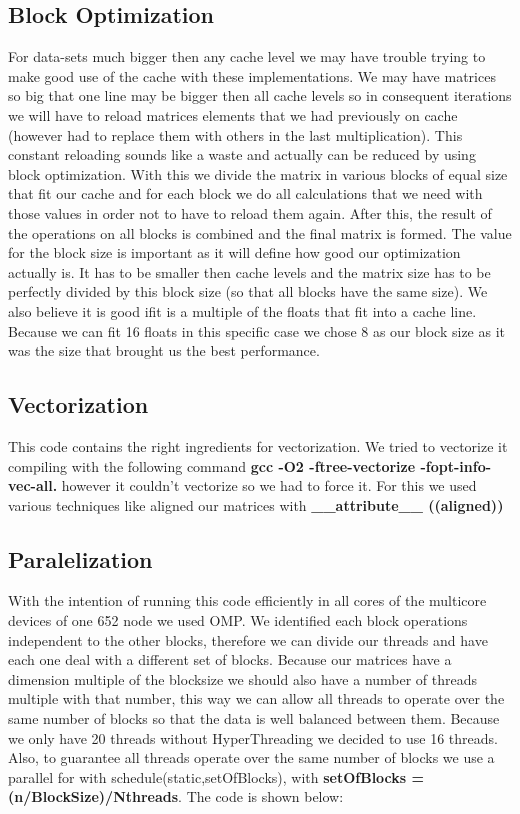 \documentclass[journal]{IEEEtran}
\begin{document}
\subsection{Block Optimization}
For data-sets much bigger then any cache level we may have trouble trying to make good use of the cache with these implementations. We may have matrices so big that one line may be bigger then all cache levels so in consequent iterations we will have to reload matrices elements that we had previously on cache (however had to replace them with others in the last multiplication). This constant reloading sounds like a waste and actually can be reduced by using block optimization. With this we divide the matrix in various blocks of equal size that fit our cache and for each block we do all calculations that we need with those values in order not to have to reload them again. After this, the result of the operations on all blocks is combined and the final matrix is formed. The value for the block size is important as it will define how good our optimization actually is. It has to be smaller then cache levels and the matrix size has to be perfectly divided by this block size (so that all blocks have the same size). We also believe it is good ifit is a multiple of the floats that fit into a cache line. Because we can fit 16 floats in this specific case we chose 8 as our block size as it was the size that brought us the best performance. 

\subsection{Vectorization}

This code contains the right ingredients for vectorization. We tried to vectorize it compiling with the following command \textbf{gcc -O2 -ftree-vectorize -fopt-info-vec-all.} however it couldn't vectorize so we had to force it. For this we used various techniques like aligned our matrices with \textbf{\_\_attribute\_\_ ((aligned))} 

\subsection{Paralelization}

With the intention of running this code efficiently in all cores of the multicore devices of one 652 node we used OMP. We identified each block operations independent to the other blocks, therefore we can divide our threads and have each one deal with a different set of blocks. Because our matrices have a dimension multiple of the blocksize we should also have a number of threads multiple with that number, this way we can allow all threads to operate over the same number of blocks so that the data is well balanced between them. Because we only have 20 threads without HyperThreading we decided to use 16 threads. Also, to guarantee all threads operate over the same number of blocks we use a parallel for with schedule(static,setOfBlocks), with \textbf{setOfBlocks = (n/BlockSize)/Nthreads}. The code is shown below:
\end{document}
